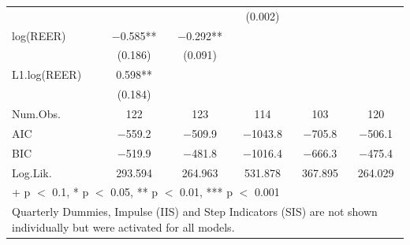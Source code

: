\begin{table}
{\begin{tabular}[t]{lccccc}
 &  &  & (\num{0.002}) &  & \\
log(REER) & \num{-0.585}** & \num{-0.292}** &  &  & \\
 & (\num{0.186}) & (\num{0.091}) &  &  & \\
L1.log(REER) & \num{0.598}** &  &  &  & \\
 & (\num{0.184}) &  &  &  & \\
\midrule
Num.Obs. & \num{122} & \num{123} & \num{114} & \num{103} & \num{120}\\
AIC & \num{-559.2} & \num{-509.9} & \num{-1043.8} & \num{-705.8} & \num{-506.1}\\
BIC & \num{-519.9} & \num{-481.8} & \num{-1016.4} & \num{-666.3} & \num{-475.4}\\
Log.Lik. & \num{293.594} & \num{264.963} & \num{531.878} & \num{367.895} & \num{264.029}\\
\bottomrule
\multicolumn{6}{l}{\rule{0pt}{1em}+ p $<$ 0.1, * p $<$ 0.05, ** p $<$ 0.01, *** p $<$ 0.001}\\
\multicolumn{6}{l}{\rule{0pt}{1em}Quarterly Dummies, Impulse (IIS) and Step Indicators (SIS) are not shown individually but were activated for all models.}\\
\end{tabular}}
\end{table}
